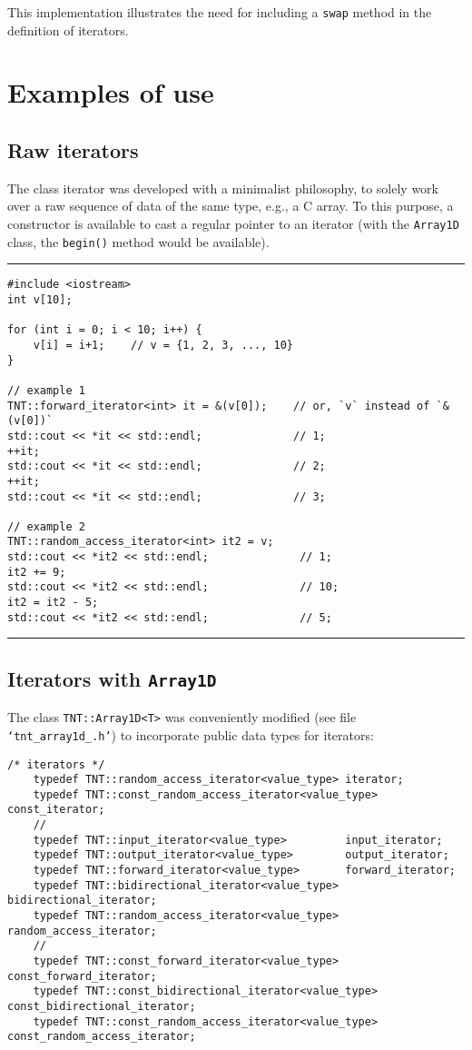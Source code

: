 This implementation illustrates the need for including a {\tt swap} method in the definition of iterators.

\section{Examples of use}

\subsection{Raw iterators}

The class iterator was developed with a minimalist philosophy, to solely work over a raw sequence of data of the same type, e.g., a C array. To this purpose, a constructor is available to cast a regular pointer to an iterator (with the {\tt Array1D} class, the {\tt begin()} method would be available).

\rule{\textwidth}{0.5pt}
\begin{verbatim}
#include <iostream>
int v[10];

for (int i = 0; i < 10; i++) {
    v[i] = i+1;    // v = {1, 2, 3, ..., 10}
}

// example 1
TNT::forward_iterator<int> it = &(v[0]);    // or, `v` instead of `&(v[0])`
std::cout << *it << std::endl;              // 1;
++it;
std::cout << *it << std::endl;              // 2;
++it;
std::cout << *it << std::endl;              // 3;

// example 2
TNT::random_access_iterator<int> it2 = v;
std::cout << *it2 << std::endl;              // 1;
it2 += 9;
std::cout << *it2 << std::endl;              // 10;
it2 = it2 - 5;
std::cout << *it2 << std::endl;              // 5;
\end{verbatim}
\rule{\textwidth}{0.5pt}

\subsection{Iterators with {\tt Array1D}}

The class {\tt TNT::Array1D<T>} was conveniently modified (see file {\tt `tnt\_array1d\_.h'}) to incorporate public data types for iterators:

\begin{verbatim}
/* iterators */
	typedef TNT::random_access_iterator<value_type> iterator;
	typedef TNT::const_random_access_iterator<value_type> const_iterator;
	//
	typedef TNT::input_iterator<value_type>         input_iterator;
	typedef TNT::output_iterator<value_type>        output_iterator;
	typedef TNT::forward_iterator<value_type>       forward_iterator;
	typedef TNT::bidirectional_iterator<value_type> bidirectional_iterator;
	typedef TNT::random_access_iterator<value_type> random_access_iterator;
	//
	typedef TNT::const_forward_iterator<value_type>       const_forward_iterator;
	typedef TNT::const_bidirectional_iterator<value_type> const_bidirectional_iterator;
	typedef TNT::const_random_access_iterator<value_type> const_random_access_iterator;
\end{verbatim}

